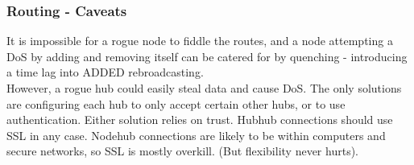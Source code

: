 \documentclass[a4paper,oneside,openany]{book}
\begin{document}
\subsubsection{Routing - Caveats}
It is impossible for a rogue node to fiddle the routes, and a node attempting a
DoS by adding and removing itself can be catered for by quenching - introducing
a time lag into ADDED rebroadcasting.\smallskip\\
However, a rogue hub could easily steal data and cause DoS. The only solutions
are configuring each hub to only accept certain other hubs, or to use
authentication. Either solution relies on trust. Hub\rarrow{}hub connections
should use SSL in any case. Node\rarrow{}hub connections are likely to be within
computers and secure networks, so SSL is mostly overkill. (But flexibility never
hurts).
\end{document}
